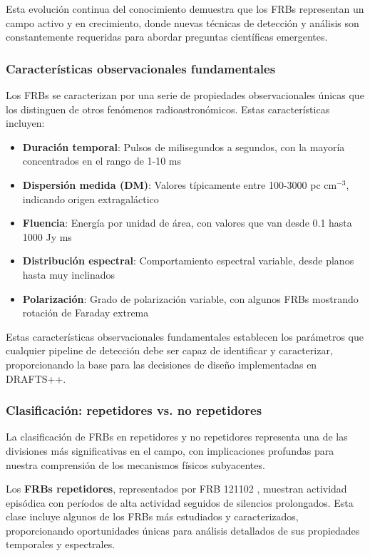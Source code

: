 Esta evolución continua del conocimiento demuestra que los FRBs representan un campo activo y en crecimiento, donde nuevas técnicas de detección y análisis son constantemente requeridas para abordar preguntas científicas emergentes.

\subsubsection{Características observacionales fundamentales}

Los FRBs se caracterizan por una serie de propiedades observacionales únicas que los distinguen de otros fenómenos radioastronómicos. Estas características incluyen:

\begin{itemize}
    \item \textbf{Duración temporal}: Pulsos de milisegundos a segundos, con la mayoría concentrados en el rango de 1-10 ms
    \item \textbf{Dispersión medida (DM)}: Valores típicamente entre 100-3000 pc cm$^{-3}$, indicando origen extragaláctico
    \item \textbf{Fluencia}: Energía por unidad de área, con valores que van desde 0.1 hasta 1000 Jy ms
    \item \textbf{Distribución espectral}: Comportamiento espectral variable, desde planos hasta muy inclinados
    \item \textbf{Polarización}: Grado de polarización variable, con algunos FRBs mostrando rotación de Faraday extrema
\end{itemize}

Estas características observacionales fundamentales establecen los parámetros que cualquier pipeline de detección debe ser capaz de identificar y caracterizar, proporcionando la base para las decisiones de diseño implementadas en DRAFTS++.

\subsubsection{Clasificación: repetidores vs. no repetidores}

La clasificación de FRBs en repetidores y no repetidores representa una de las divisiones más significativas en el campo, con implicaciones profundas para nuestra comprensión de los mecanismos físicos subyacentes.

Los \textbf{FRBs repetidores}, representados por FRB 121102 \cite{cruces2020frb121102}, muestran actividad episódica con períodos de alta actividad seguidos de silencios prolongados. Esta clase incluye algunos de los FRBs más estudiados y caracterizados, proporcionando oportunidades únicas para análisis detallados de sus propiedades temporales y espectrales.

